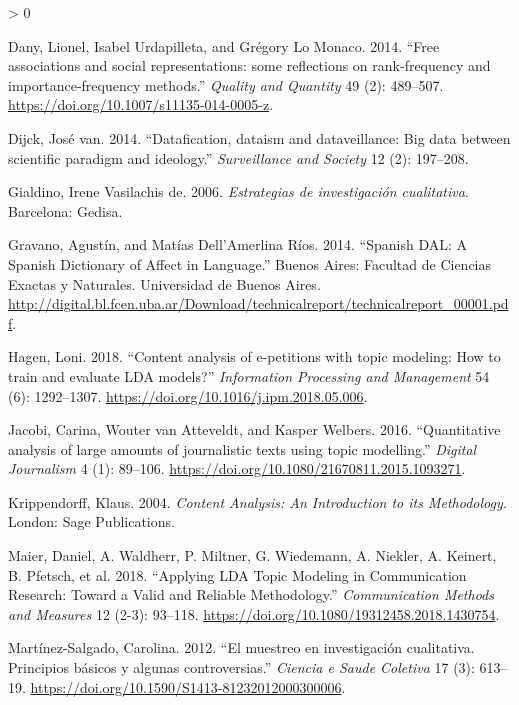 \documentclass[
]{book}
\newlength{\cslhangindent}
\newenvironment{CSLReferences}[2] %
 {%
  \setlength{\parindent}{0pt}
  \ifodd #1 \everypar{\setlength{\hangindent}{\cslhangindent}}\ignorespaces\fi
  \ifnum #2 > 0
  \setlength{\parskip}{#2\baselineskip}
  \fi
 }%
 {}
\begin{document}
\begin{CSLReferences}{1}{0}
\leavevmode\hypertarget{ref-Dany2014}{}%
Dany, Lionel, Isabel Urdapilleta, and Grégory Lo Monaco. 2014. {``{Free associations and social representations: some reflections on rank-frequency and importance-frequency methods}.''} \emph{Quality and Quantity} 49 (2): 489--507. \url{https://doi.org/10.1007/s11135-014-0005-z}.

\leavevmode\hypertarget{ref-VanDijck2014}{}%
Dijck, José van. 2014. {``{Datafication, dataism and dataveillance: Big data between scientific paradigm and ideology}.''} \emph{Surveillance and Society} 12 (2): 197--208.

\leavevmode\hypertarget{ref-Gialdino2006}{}%
Gialdino, Irene Vasilachis de. 2006. \emph{{Estrategias de investigaci{ó}n cualitativa}}. Barcelona: Gedisa.

\leavevmode\hypertarget{ref-Gravano2014}{}%
Gravano, Agustín, and Matías Dell'Amerlina Ríos. 2014. {``{Spanish DAL: A Spanish Dictionary of Affect in Language}.''} Buenos Aires: Facultad de Ciencias Exactas y Naturales. Universidad de Buenos Aires. \url{http://digital.bl.fcen.uba.ar/Download/technicalreport/technicalreport_00001.pdf}.

\leavevmode\hypertarget{ref-Hagen2018}{}%
Hagen, Loni. 2018. {``{Content analysis of e-petitions with topic modeling: How to train and evaluate LDA models?}''} \emph{Information Processing and Management} 54 (6): 1292--1307. \url{https://doi.org/10.1016/j.ipm.2018.05.006}.

\leavevmode\hypertarget{ref-Jacobi2016}{}%
Jacobi, Carina, Wouter van Atteveldt, and Kasper Welbers. 2016. {``{Quantitative analysis of large amounts of journalistic texts using topic modelling}.''} \emph{Digital Journalism} 4 (1): 89--106. \url{https://doi.org/10.1080/21670811.2015.1093271}.

\leavevmode\hypertarget{ref-Krippendorff2004}{}%
Krippendorff, Klaus. 2004. \emph{{Content Analysis: An Introduction to its Methodology.}} London: Sage Publications.

\leavevmode\hypertarget{ref-Maier2018}{}%
Maier, Daniel, A. Waldherr, P. Miltner, G. Wiedemann, A. Niekler, A. Keinert, B. Pfetsch, et al. 2018. {``{Applying LDA Topic Modeling in Communication Research: Toward a Valid and Reliable Methodology}.''} \emph{Communication Methods and Measures} 12 (2-3): 93--118. \url{https://doi.org/10.1080/19312458.2018.1430754}.

\leavevmode\hypertarget{ref-Martinez-Salgado2012}{}%
Martínez-Salgado, Carolina. 2012. {``{El muestreo en investigaci{ó}n cualitativa. Principios b{á}sicos y algunas controversias}.''} \emph{Ciencia e Saude Coletiva} 17 (3): 613--19. \url{https://doi.org/10.1590/S1413-81232012000300006}.


\end{CSLReferences}
\end{document}
